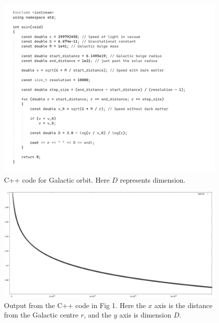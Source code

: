 \documentclass[12pt]{article}
\begin{document}
\pagebreak


\begin{figure} 
\centering
  \includegraphics[width = 6 in]{code.png}
  \caption{ C++ code for Galactic orbit. Here $D$ represents dimension.}
\end{figure}


\begin{figure} 
\centering
  \includegraphics[width = 5 in]{dimension_graph.png}
  \caption{ Output from the C++ code in Fig 1.
Here the $x$ axis is the distance from the Galactic centre $r$, and the $y$ axis is dimension $D$.}
\end{figure}
\end{document}
